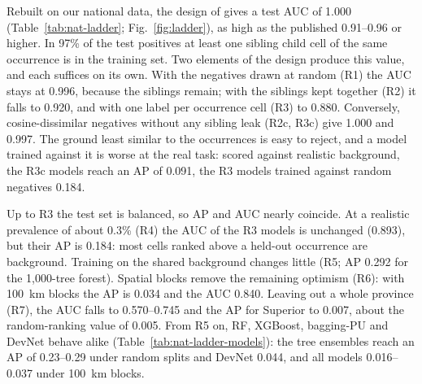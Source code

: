\documentclass[pdflatex,sn-apa]{sn-jnl}
\begin{document}
Rebuilt on our national data, the design of \citet{Parsa2024} gives a test AUC of 1.000 (Table~\ref{tab:nat-ladder}; Fig.~\ref{fig:ladder}), as high as the published 0.91--0.96 or higher. In 97\% of the test positives at least one sibling child cell of the same occurrence is in the training set. Two elements of the design produce this value, and each suffices on its own. With the negatives drawn at random (R1) the AUC stays at 0.996, because the siblings remain; with the siblings kept together (R2) it falls to 0.920, and with one label per occurrence cell (R3) to 0.880. Conversely, cosine-dissimilar negatives without any sibling leak (R2c, R3c) give 1.000 and 0.997. The ground least similar to the occurrences is easy to reject, and a model trained against it is worse at the real task: scored against realistic background, the R3c models reach an AP of 0.091, the R3 models trained against random negatives 0.184.

Up to R3 the test set is balanced, so AP and AUC nearly coincide. At a realistic prevalence of about 0.3\% (R4) the AUC of the R3 models is unchanged (0.893), but their AP is 0.184: most cells ranked above a held-out occurrence are background. Training on the shared background changes little (R5; AP 0.292 for the 1,000-tree forest). Spatial blocks remove the remaining optimism (R6): with 100~km blocks the AP is 0.034 and the AUC 0.840. Leaving out a whole province (R7), the AUC falls to 0.570--0.745 and the AP for Superior to 0.007, about the random-ranking value of 0.005. From R5 on, RF, XGBoost, bagging-PU and DevNet behave alike (Table~\ref{tab:nat-ladder-models}): the tree ensembles reach an AP of 0.23--0.29 under random splits and DevNet 0.044, and all models 0.016--0.037 under 100~km blocks.
\end{document}
